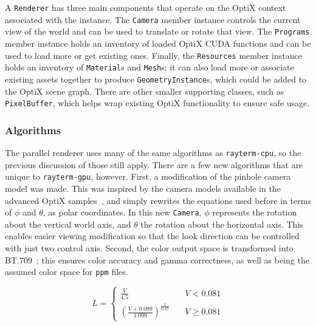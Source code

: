 A \texttt{Renderer} has three main components that operate on the OptiX context associated with the instance.
The \texttt{Camera} member instance controls the current view of the world and can be used to translate or rotate that view.
The \texttt{Programs} member instance holds an inventory of loaded OptiX CUDA functions and can be used to load more or get existing ones.
Finally, the \texttt{Resources} member instance holds an inventory of \texttt{Material}s and \texttt{Mesh}s; it can also load more or associate existing assets together to produce \texttt{GeometryInstance}s, which could be added to the OptiX scene graph.
There are other smaller supporting classes, such as \texttt{PixelBuffer}, which helps wrap existing OptiX functionality to ensure safe usage.

\subsubsection{Algorithms} \label{ch:methods:renderer:parallel:algorithms}

The parallel renderer uses many of the same algorithms as \texttt{rayterm-cpu}, so the previous discussion of those still apply.
There are a few new algorithms that are unique to \texttt{rayterm-gpu}, however.
First, a modification of the pinhole camera model was made.
This was inspired by the camera models available in the advanced OptiX samples~\cite{optixsamples}, and simply rewrites the equations used before in terms of $\phi$ and $\theta$, as polar coordinates.
In this new \texttt{Camera}, $\phi$ represents the rotation about the vertical world axis, and $\theta$ the rotation about the horizontal axis.
This enables easier viewing modification so that the look direction can be controlled with just two control axis.
Second, the color output space is transformed into BT.709~\cite{ituBT709}; this ensures color accuracy and gamma correctness, as well as being the assumed color space for \texttt{ppm} files.


\begin{equation}
\label{equation:bt709}
  L = \left\{
              \begin{array}{ll}
                \frac{V}{4.5} & \quad V < 0.081 \\
                (\frac{V + 0.099}{1.099})^\frac{1}{0.45} & \quad V \geq 0.081
              \end{array}
    \right.
\end{equation}

